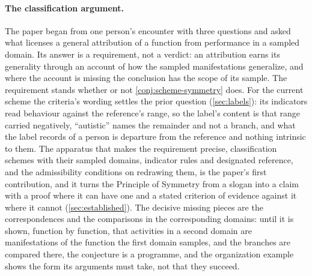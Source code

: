 \paragraph{The classification argument.} The paper began from one person's encounter with three questions and asked what licenses a general attribution of a function from performance in a sampled domain. Its answer is a requirement, not a verdict: an attribution earns its generality through an account of how the sampled manifestations generalize, and where the account is missing the conclusion has the scope of its sample. The requirement stands whether or not \autoref{conj:scheme-symmetry} does. For the current scheme the criteria's wording settles the prior question (\autoref{sec:labels}): its indicators read behaviour against the reference's range, so the label's content is that range carried negatively, ``autistic'' names the remainder and not a branch, and what the label records of a person is departure from the reference and nothing intrinsic to them. The apparatus that makes the requirement precise, classification schemes with their sampled domains, indicator rules and designated reference, and the admissibility conditions on redrawing them, is the paper's first contribution, and it turns the Principle of Symmetry from a slogan into a claim with a proof where it can have one and a stated criterion of evidence against it where it cannot (\autoref{sec:established}). The decisive missing pieces are the correspondences and the comparisons in the corresponding domains: until it is shown, function by function, that activities in a second domain are manifestations of the function the first domain samples, and the branches are compared there, the conjecture is a programme, and the organization example shows the form its arguments must take, not that they succeed.
